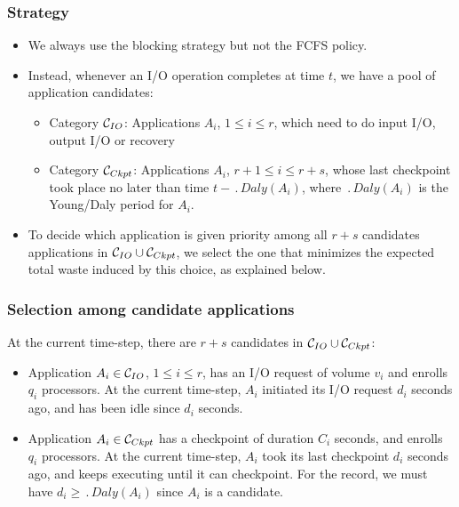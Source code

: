 \subsubsection{Strategy}

\begin{itemize}
  \item We always use the blocking strategy but not the FCFS policy.
  \item Instead, whenever an I/O operation completes at time $t$, we have a pool of application candidates:
  \begin{itemize}
   \item Category \IOcat $\mathcal{C}_{IO}$: Applications $A_{i}$, $1\leq i \leq r$, which need to do input I/O, output I/O or recovery
  \item Category \Ckptcat $\mathcal{C}_{Ckpt}$: Applications $A_{i}$, $r+1\leq i \leq r+s$,
  whose last checkpoint took place no later than time $t - \period{Daly}(A_{i})$, where $\period{Daly}(A_{i})$ is the Young/Daly period for $A_{i}$.
  \end{itemize}
  \item To decide which application is given priority among all $r+s$ candidates applications in $\mathcal{C}_{IO} \cup \mathcal{C}_{Ckpt}$, we select the one that minimizes the expected total waste induced by this choice, as explained below.
  \end{itemize}

 \subsubsection{Selection among candidate applications}

At the current time-step, there are $r+s$ candidates in $\mathcal{C}_{IO} \cup \mathcal{C}_{Ckpt}$:
\begin{itemize}
  \item Application $A_{i} \in \mathcal{C}_{IO}$, $1\leq i \leq r$,
  has an I/O request of volume $v_{i}$ and enrolls $q_{i}$ processors. At the current time-step, $A_{i}$ initiated its I/O request $d_{i}$ seconds ago, and has been idle since $d_{i}$ seconds.
 \item Application $A_{i} \in  \mathcal{C}_{Ckpt}$ has a checkpoint of duration $C_{i}$ seconds,
  and enrolls $q_{i}$ processors. At the current time-step, $A_{i}$ took its last checkpoint
  $d_{i}$ seconds ago, and keeps executing until it can checkpoint. For the record, we must have $d_{i} \geq \period{Daly}(A_{i})$
  since $A_{i}$ is a candidate.
  \end{itemize}

